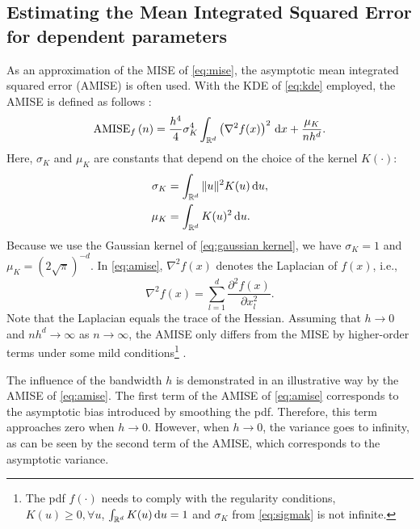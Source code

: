 \subsection{Estimating the Mean Integrated Squared Error for dependent parameters}
\label{sec:mise dependent}

As an approximation of the MISE of \cref{eq:mise}, the asymptotic mean integrated squared error (AMISE) is often used. With the KDE of \cref{eq:kde} employed, the AMISE is defined as follows \cite{marron1992exact}:
\begin{equation}
	\label{eq:amise}
	\textup{AMISE}_{f} \left( n \right) = \frac{h^4}{4} \sigma_K^4 \int_{\mathbb{R}^d} \left( \nabla^2 f(x) \right)^2 \mathrm{\,d} x + \frac{\mu_K}{nh^d}.
\end{equation}
Here, $\sigma_K$ and $\mu_K$ are constants that depend on the choice of the kernel $K(\cdot)$:
\begin{align}
	\sigma_K &= \int_{\mathbb{R}^d} \|u\|^2 K(u) \mathrm{\,d} u, \label{eq:sigmak} \\
	\mu_K &= \int_{\mathbb{R}^d} K(u)^2 \mathrm{\,d} u.
\end{align}
Because we use the Gaussian kernel of \cref{eq:gaussian kernel}, we have $\sigma_K=1$ and $\mu_K=(2\sqrt{\pi})^{-d}$. In \cref{eq:amise}, $\nabla^2 f(x)$ denotes the Laplacian of $f(x)$, i.e., 
\begin{equation}
	\nabla^2 f(x) = \sum_{l=1}^d \frac{\partial^2 f(x)}{\partial x_l^2}.
\end{equation}
Note that the Laplacian equals the trace of the Hessian. Assuming that $h \rightarrow 0$ and $nh^d \rightarrow \infty$ as $n \rightarrow \infty$, the AMISE only differs from the MISE by higher-order terms under some mild conditions\footnote{The pdf $f(\cdot)$ needs to comply with the regularity conditions, $K(u) \geq 0, \forall u$, $\int_{\mathbb{R}^d} K(u) \mathrm{\,d} u = 1$ and $\sigma_K$ from \cref{eq:sigmak} is not infinite.} \cite{silverman1986density}.

The influence of the bandwidth $h$ is demonstrated in an illustrative way by the AMISE of \cref{eq:amise}. The first term of the AMISE of \cref{eq:amise} corresponds to the asymptotic bias introduced by smoothing the pdf. Therefore, this term approaches zero when $h \rightarrow 0$. However, when $h \rightarrow 0$, the variance goes to infinity, as can be seen by the second term of the AMISE, which corresponds to the asymptotic variance. 


